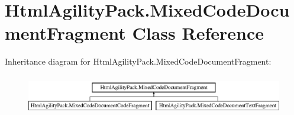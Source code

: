 \hypertarget{class_html_agility_pack_1_1_mixed_code_document_fragment}{}\section{Html\+Agility\+Pack.\+Mixed\+Code\+Document\+Fragment Class Reference}
\label{class_html_agility_pack_1_1_mixed_code_document_fragment}
Inheritance diagram for Html\+Agility\+Pack.\+Mixed\+Code\+Document\+Fragment\+:\begin{figure}[H]
\begin{center}
\leavevmode
\includegraphics[height=1.783440cm]{class_html_agility_pack_1_1_mixed_code_document_fragment}
\end{center}
\end{figure}
